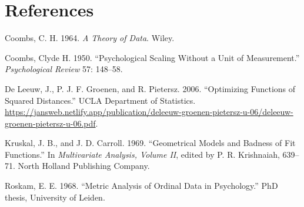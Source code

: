 \documentclass[
  12pt,
]{article}
\newlength{\cslhangindent}
\newenvironment{CSLReferences}[2] %
 {\begin{list}{}{%
  \setlength{\itemindent}{0pt}
  \setlength{\leftmargin}{0pt}
  \setlength{\parsep}{0pt}
  \ifodd #1
   \setlength{\leftmargin}{\cslhangindent}
   \setlength{\itemindent}{-1\cslhangindent}
  \fi
  \setlength{\itemsep}{#2\baselineskip}}}
 {\end{list}}
\begin{document}
\section*{References}\label{references}

\label{refs}
\begin{CSLReferences}{1}{0}
Coombs, C. H. 1964. \emph{{A Theory of Data}}. Wiley.

Coombs, Clyde H. 1950. {``Psychological Scaling Without a Unit of Measurement.''} \emph{Psychological Review} 57: 148--58.

De Leeuw, J., P. J. F. Groenen, and R. Pietersz. 2006. {``{Optimizing Functions of Squared Distances}.''} UCLA Department of Statistics. \url{https://jansweb.netlify.app/publication/deleeuw-groenen-pietersz-u-06/deleeuw-groenen-pietersz-u-06.pdf}.

Kruskal, J. B., and J. D. Carroll. 1969. {``{Geometrical Models and Badness of Fit Functions}.''} In \emph{Multivariate Analysis, Volume II}, edited by P. R. Krishnaiah, 639--71. North Holland Publishing Company.

Roskam, E. E. 1968. {``{Metric Analysis of Ordinal Data in Psychology}.''} PhD thesis, University of Leiden.

\end{CSLReferences}
\end{document}
